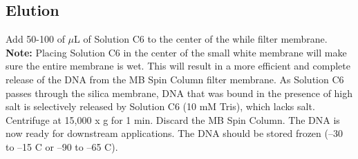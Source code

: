 \documentclass[12pt]{SOP5_beta}\usepackage[]{graphicx}\usepackage[]{xcolor}
\begin{document}
\subsection*{Elution}
\NP Add 50-100 of $\mu$L of Solution C6 to the center of the while filter membrane. \textbf{Note:} Placing Solution C6 in the center of the small white membrane will make sure the entire membrane is wet. This will result in a more efficient and complete release of the DNA from the MB Spin Column filter membrane. As Solution C6 passes through the silica
membrane, DNA that was bound in the presence of high salt is selectively released by Solution C6 (10 mM Tris), which lacks salt.
\NP Centrifuge at 15,000 x g for 1 min. Discard the MB Spin Column. The DNA is now ready for downstream applications.
\NP The DNA should be stored frozen  (–30 to –15 \degree C or –90 to –65 \degree C).
\end{document}
